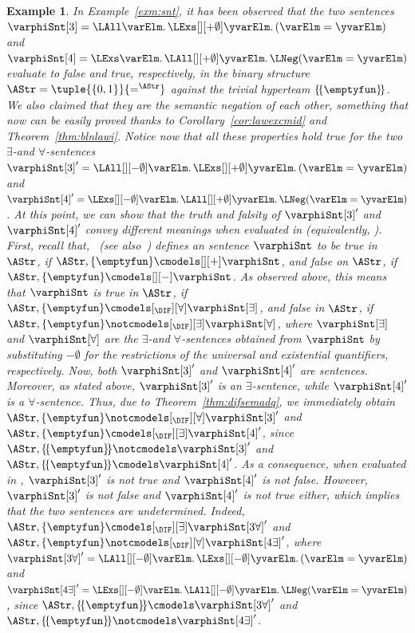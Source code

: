\documentclass[authoryear]{elsarticle}
\newtheorem{example}{Example}
\newcommand{\TrvTeamAsg}{\{\emptyfun\}}
\newcommand{\TrvHypAsg}{\{\!\{\emptyfun\}\!\}}
\begin{document}
\begin{example}
  \label{exm:nondet}
  In Example~\ref{exm:snt}, it has been observed that the two \ADIF sentences
  $\varphiSnt[3] = \LAll \varElm \ldotp \LExs[][+\emptyset] \yvarElm \ldotp
  (\varElm = \yvarElm)$ and $\varphiSnt[4] = \LExs \varElm \ldotp
  \LAll[][+\emptyset] \yvarElm \ldotp \LNeg (\varElm = \yvarElm)$ evaluate
  to false and true, respectively, in the binary structure $\AStr = \tuple {\{
  0, 1 \}} {=^{\AStr}}$ against the trivial hyperteam $\TrvHypAsg$.
  We also claimed that they are the semantic negation of each other, something
  that now can be easily proved thanks to Corollary~\ref{cor:lawexcmid} and
  Theorem~\ref{thm:blnlawi}.
  Notice now that all these properties hold true for the two $\exists$-\DIF and
  $\forall$-\DIF sentences $\varphiSnt[3]' = \LAll[][-\emptyset] \varElm \ldotp
  \LExs[][+\emptyset] \yvarElm \ldotp (\varElm = \yvarElm)$ and $\varphiSnt[4]'
  = \LExs[][-\emptyset] \varElm \ldotp \LAll[][+\emptyset] \yvarElm \ldotp
  \LNeg (\varElm = \yvarElm)$.
  At this point, we can show that the truth and falsity of $\varphiSnt[3]'$ and
  $\varphiSnt[4]'$ convey different meanings when evaluated in \IF
  (equivalently, \DIF).
  First, recall that,~\cite{Hod97a} (see also~\cite{MSS11}) defines an \IF
  sentence $\varphiSnt$ to be \emph{true} in $\AStr$, if $\AStr, \TrvTeamAsg
  \cmodels[][+] \varphiSnt$, and \emph{false} on $\AStr$, if $\AStr, \TrvTeamAsg
  \cmodels[][-] \varphiSnt$.
  As observed above, this means that $\varphiSnt$ is \emph{true} in $\AStr$, if
  $\AStr, \TrvTeamAsg \cmodels[_{\DIF}][\forall] \varphiSnt[\exists]$, and
  \emph{false} in $\AStr$, if $\AStr, \TrvTeamAsg \notcmodels[_{\DIF}][\exists]
  \varphiSnt[\forall]$, where $\varphiSnt[\exists]$ and $\varphiSnt[\forall]$
  are the $\exists$-\DIF and $\forall$-\DIF sentences obtained from
  $\varphiSnt$ by substituting $-\emptyset$ for the restrictions of the
  universal and existential quantifiers, respectively.
  Now, both $\varphiSnt[3]'$ and $\varphiSnt[4]'$ are \IF sentences.
  Moreover, as stated above, $\varphiSnt[3]'$ is an $\exists$-\DIF sentence,
  while $\varphiSnt[4]'$ is a $\forall$-\DIF sentence.
  Thus, due to Theorem~\ref{thm:difsemadq}, we immediately obtain $\AStr,
  \TrvTeamAsg \notcmodels[_{\DIF}][\forall] \varphiSnt[3]'$ and $\AStr,
  \TrvTeamAsg \cmodels[_{\DIF}][\exists] \varphiSnt[4]'$, since $\AStr,
  \TrvHypAsg \notcmodels \varphiSnt[3]'$ and $\AStr,
  \TrvHypAsg \cmodels \varphiSnt[4]'$.
  As a consequence, when evaluated in \IF, $\varphiSnt[3]'$ is not true and
  $\varphiSnt[4]'$ is not false.
  However, $\varphiSnt[3]'$ is not false and $\varphiSnt[4]'$ is not true
  either, which implies that the two sentences are undetermined.
  Indeed, $\AStr, \TrvTeamAsg \cmodels[_{\DIF}][\exists] \varphiSnt[3\forall]'$
  and $\AStr, \TrvTeamAsg \notcmodels[_{\DIF}][\forall] \varphiSnt[4\exists]'$,
  where $\varphiSnt[3\forall]' = \LAll[][-\emptyset] \varElm \ldotp
  \LExs[][-\emptyset] \yvarElm \ldotp (\varElm = \yvarElm)$ and
  $\varphiSnt[4\exists]' = \LExs[][-\emptyset] \varElm \ldotp
  \LAll[][-\emptyset] \yvarElm \ldotp \LNeg (\varElm = \yvarElm)$, since
  $\AStr, \TrvHypAsg \cmodels \varphiSnt[3\forall]'$ and $\AStr, \TrvHypAsg
  \notcmodels \varphiSnt[4\exists]'$.
\end{example}
\end{document}
